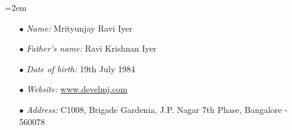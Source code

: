 \documentclass{scrartcl}
\newcommand{\Description}[1]{\hangindent=2em\hangafter=0\noindent\raggedright\footnotesize{#1}\par\normalsize}
\begin{document}
\begin{cv}{
\href{http://www.develmj.com}{}
}
\vspace{1.5em}

\noindent{}
\vspace{0.5em}

\Description{
\begin{itemize}
  \item[\footnotesize$\bullet$] \textsl{Name:} Mrityunjay Ravi Iyer
  \item[\footnotesize$\bullet$] \textsl{Father's name:} Ravi Krishnan Iyer
  \item[\footnotesize$\bullet$] \textsl{Date of birth:} 19th July 1984
  \item[\footnotesize$\bullet$] \textsl{Website:} \url{www.develmj.com}
  \item[\footnotesize$\bullet$] \textsl{Address:} C1008, Brigade
    Gardenia, J.P. Nagar 7th Phase, Bangalore - 560078
\end{itemize}
}
\end{cv}
\end{document}
